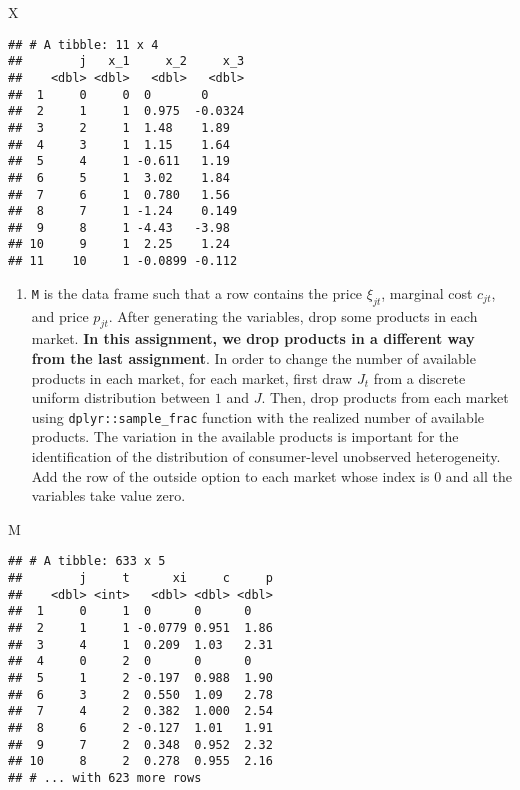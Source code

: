 \documentclass[
]{book}
\newenvironment{Shaded}{\begin{snugshade}}{\end{snugshade}}
\newcommand{\NormalTok}[1]{#1}
\providecommand{\tightlist}{%
  \setlength{\itemsep}{0pt}\setlength{\parskip}{0pt}}
\begin{document}
\begin{Shaded}
\begin{Highlighting}[]
\NormalTok{X}
\end{Highlighting}
\end{Shaded}

\begin{verbatim}
## # A tibble: 11 x 4
##        j   x_1     x_2     x_3
##    <dbl> <dbl>   <dbl>   <dbl>
##  1     0     0  0       0     
##  2     1     1  0.975  -0.0324
##  3     2     1  1.48    1.89  
##  4     3     1  1.15    1.64  
##  5     4     1 -0.611   1.19  
##  6     5     1  3.02    1.84  
##  7     6     1  0.780   1.56  
##  8     7     1 -1.24    0.149 
##  9     8     1 -4.43   -3.98  
## 10     9     1  2.25    1.24  
## 11    10     1 -0.0899 -0.112
\end{verbatim}

\begin{enumerate}
\def\labelenumi{\arabic{enumi}.}
\setcounter{enumi}{2}
\tightlist
\item
  \texttt{M} is the data frame such that a row contains the price \(\xi_{jt}\), marginal cost \(c_{jt}\), and price \(p_{jt}\). After generating the variables, drop some products in each market. \textbf{In this assignment, we drop products in a different way from the last assignment}. In order to change the number of available products in each market, for each market, first draw \(J_t\) from a discrete uniform distribution between \(1\) and \(J\). Then, drop products from each market using \texttt{dplyr::sample\_frac} function with the realized number of available products. The variation in the available products is important for the identification of the distribution of consumer-level unobserved heterogeneity. Add the row of the outside option to each market whose index is \(0\) and all the variables take value zero.
\end{enumerate}

\begin{Shaded}
\begin{Highlighting}[]
\NormalTok{M}
\end{Highlighting}
\end{Shaded}

\begin{verbatim}
## # A tibble: 633 x 5
##        j     t      xi     c     p
##    <dbl> <int>   <dbl> <dbl> <dbl>
##  1     0     1  0      0      0   
##  2     1     1 -0.0779 0.951  1.86
##  3     4     1  0.209  1.03   2.31
##  4     0     2  0      0      0   
##  5     1     2 -0.197  0.988  1.90
##  6     3     2  0.550  1.09   2.78
##  7     4     2  0.382  1.000  2.54
##  8     6     2 -0.127  1.01   1.91
##  9     7     2  0.348  0.952  2.32
## 10     8     2  0.278  0.955  2.16
## # ... with 623 more rows
\end{verbatim}
\end{document}
